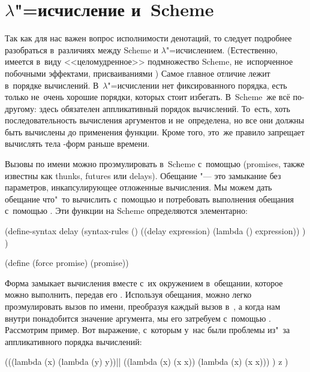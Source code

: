\section{\texorpdfstring{$\lambda$"=исчисление и~Scheme}%
{λ-исчисление и Scheme}}%
\label{denotational/sect:lambdify}

Так как для нас важен вопрос исполнимости денотаций, то следует подробнее
разобраться в~различиях между Scheme и $\lambda$"=исчислением. (Естественно,
имеется в~виду <<целомудренное>> подмножество Scheme, не~испорченное побочными
эффектами, присваиваниями {\itp}) Самое главное отличие лежит в~порядке
вычислений. В~$\lambda$"=исчислении нет фиксированного порядка, есть только
не~очень хорошие порядки, которых стоит избегать. В~Scheme~же всё по-другому:
здесь обязателен аппликативный порядок вычислений. То~есть, хоть
последовательность вычисления аргументов и не~определена, но все они должны быть
вычислены до применения функции. Кроме того, это~же правило запрещает вычислять
тела -форм раньше времени.

Вызовы по имени можно проэмулировать в~Scheme с~помощью 
(promises, также известны как thunks, futures или delays). Обещание "--- это
замыкание без параметров, инкапсулирующее отложенные вычисления. Мы можем дать
обещание что"~то вычислить с~помощью  и потребовать выполнения
обещания с~помощью . Эти функции на Scheme определяются элементарно:

\begin{code:lisp}
(define-syntax delay
  (syntax-rules ()
    ((delay expression) (lambda () expression)) ) )

(define (force promise) (promise))
\end{code:lisp}

Форма  замыкает вычисления вместе с~их окружением в~обещании, которое
можно выполнить, передав его . Используя обещания, можно легко
проэмулировать вызов по имени, преобразуя каждый вызов 
в~, а когда нам внутри понадобится
значение аргумента, мы его затребуем с~помощью . Рассмотрим пример.
Вот выражение, с~которым у~нас были проблемы из"~за аппликативного порядка
вычислений:

\begin{code:lisp}
(((lambda (x) (lambda (y) y))||
  ((lambda (x) (x x)) (lambda (x) (x x))) ) z )
\end{code:lisp}


